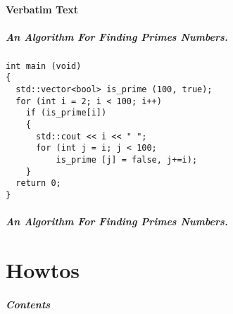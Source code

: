   \subsection{Verbatim Text}
  \begin{frame}[fragile]
  \frametitle{An Algorithm For Finding Primes Numbers.}
  \begin{verbatim}
int main (void)
{
  std::vector<bool> is_prime (100, true);
  for (int i = 2; i < 100; i++)
    if (is_prime[i])
    {
      std::cout << i << " ";
      for (int j = i; j < 100;
          is_prime [j] = false, j+=i);
    }
  return 0;
}
\end{verbatim}
\end{frame}
\begin{frame}[fragile]
\frametitle{An Algorithm For Finding Primes Numbers.}
\begin{semiverbatim}
\end{semiverbatim}
\end{frame}
\part{Howtos}
\frame{\partpage}
\begin{frame}
\frametitle{Contents}
\tableofcontents[%
pausesections, %
  ]
  \end{frame}
